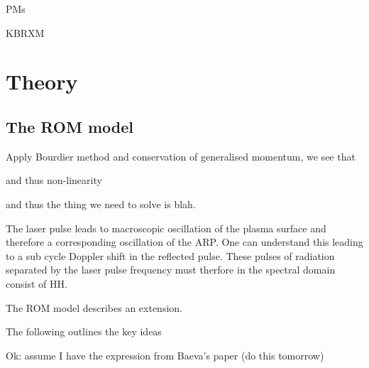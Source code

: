 PMs

KBRXM

\section{\label{ch:3-sec:theory}Theory}




\subsection{The ROM model}

Apply Bourdier method and conservation of generalised momentum, we see that 

and thus non-linearity

and thus the thing we need to solve is blah.


The laser pulse leads to macroscopic oscillation of the plasma surface and therefore a corresponding oscillation of the ARP. One can understand this leading to a sub cycle Doppler shift in the reflected pulse. These pulses of radiation separated by the laser pulse frequency must therfore in the spectral domain consist of HH.

The \ac{ROM} model describes an extension. 

The following outlines the key ideas 

Ok: assume I have the expression from Baeva's paper (do this tomorrow)

